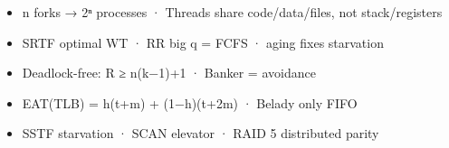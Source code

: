 \begin{revbox}

\begin{itemize}
\tightlist
\item
  n forks → 2ⁿ processes · Threads share code/data/files, not stack/registers
\item
  SRTF optimal WT · RR big q = FCFS · aging fixes starvation
\item
  Deadlock-free: R ≥ n(k−1)+1 · Banker = avoidance
\item
  EAT(TLB) = h(t+m) + (1−h)(t+2m) · Belady only FIFO
\item
  SSTF starvation · SCAN elevator · RAID 5 distributed parity
\end{itemize}

\end{revbox}

